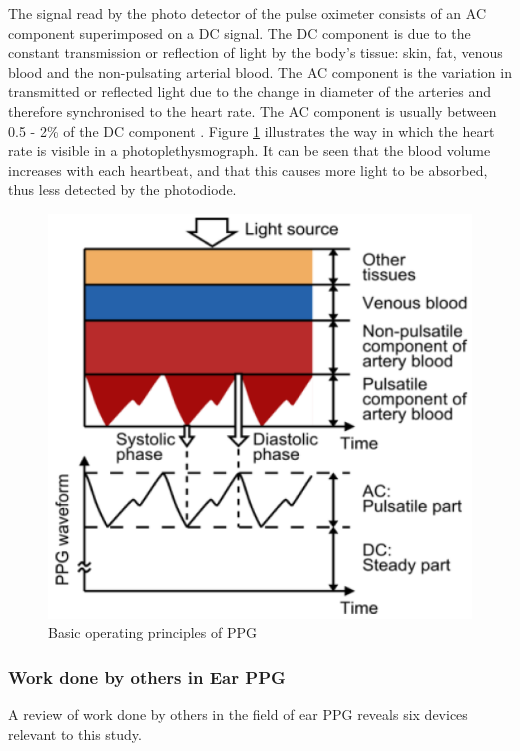 \medskip
The signal read by the photo detector of the pulse oximeter consists of an AC component superimposed on a DC signal. The DC component is due to the constant transmission or reflection of light by the body's tissue: skin, fat, venous blood and the non-pulsating arterial blood. The AC component is the variation in transmitted or reflected light due to the change in diameter of the arteries and therefore synchronised to the heart rate. The AC component is usually between 0.5 - 2\% of the DC component \citep{tavakoli2006analog}. Figure \ref{fig:PPG} illustrates the way in which the heart rate is visible in a photoplethysmograph. It can be seen that the blood volume increases with each heartbeat, and that this causes more light to be absorbed, thus less detected by the photodiode.

\medskip

\begin{figure}[h]
   \centering
   \includegraphics[scale=1.6]{figs/PPG}
   \caption{Basic operating principles of PPG \citep{tamura2014wearable}}
   \label{fig:PPG}
\end{figure}

\subsubsection{Work done by others in Ear PPG}
A review of work done by others in the field of ear PPG reveals six devices relevant to this study.

